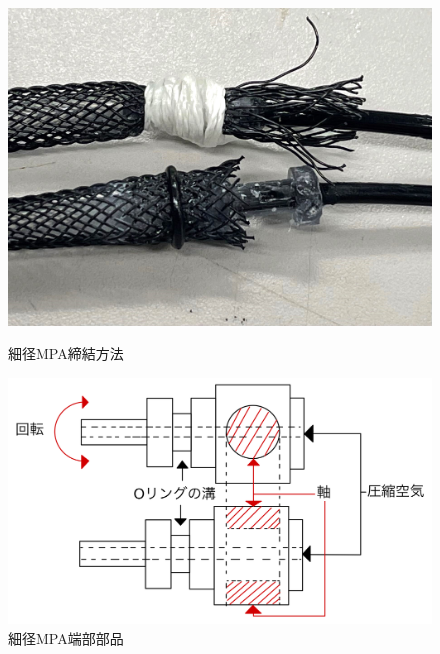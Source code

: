 \documentclass{jarticle}
\begin{document}
\begin{figure}[t]
  \begin{minipage}[b]{0.47\columnwidth}
    \centering
    \includegraphics[scale=0.05]{image/mpa_oring_1.jpg}
    \vspace{-2mm}
    \caption{細径MPA締結方法}
    \label{fig:OringMPA}
  \end{minipage}
  \hspace{0.04\columnwidth}
  \begin{minipage}[b]{0.47\columnwidth}
    \centering
    \includegraphics[scale=0.047]{image/MPA_irast.jpg}
    \vspace{-2mm}
    \caption{細径MPA端部部品}
    \label{fig:MPAparts}
  \end{minipage}
\end{figure}
\end{document}
